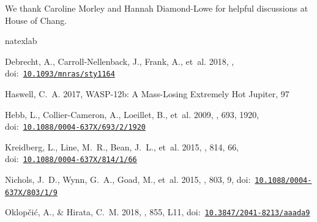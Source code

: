 \documentclass[RNAAS]{aastex62}
\begin{document}
\acknowledgements
We thank Caroline Morley and Hannah Diamond-Lowe for helpful discussions at
House of Chang.

%
%

 \newcommand{\noop}[1]{}
\begin{thebibliography}{}
\expandafter\ifx\csname natexlab\endcsname\relax\def\natexlab#1{#1}\fi
\providecommand{\url}[1]{\href{#1}{#1}}
\providecommand{\dodoi}[1]{doi:~\href{http://doi.org/#1}{\nolinkurl{#1}}}
\providecommand{\doeprint}[1]{\href{http://ascl.net/#1}{\nolinkurl{http://ascl.net/#1}}}
\providecommand{\doarXiv}[1]{\href{https://arxiv.org/abs/#1}{\nolinkurl{https://arxiv.org/abs/#1}}}

{Debrecht}, A., {Carroll-Nellenback}, J., {Frank}, A., {et~al.} 2018, \mnras,
  \dodoi{10.1093/mnras/sty1164}

{Haswell}, C.~A. 2017, {WASP-12b: A Mass-Losing Extremely Hot Jupiter}, 97

{Hebb}, L., {Collier-Cameron}, A., {Loeillet}, B., {et~al.} 2009, \apj, 693,
  1920, \dodoi{10.1088/0004-637X/693/2/1920}

{Kreidberg}, L., {Line}, M.~R., {Bean}, J.~L., {et~al.} 2015, \apj, 814, 66,
  \dodoi{10.1088/0004-637X/814/1/66}

{Nichols}, J.~D., {Wynn}, G.~A., {Goad}, M., {et~al.} 2015, \apj, 803, 9,
  \dodoi{10.1088/0004-637X/803/1/9}

{Oklop{\v c}i{\'c}}, A., \& {Hirata}, C.~M. 2018, \apjl, 855, L11,
  \dodoi{10.3847/2041-8213/aaada9}


\end{thebibliography}
\end{document}
